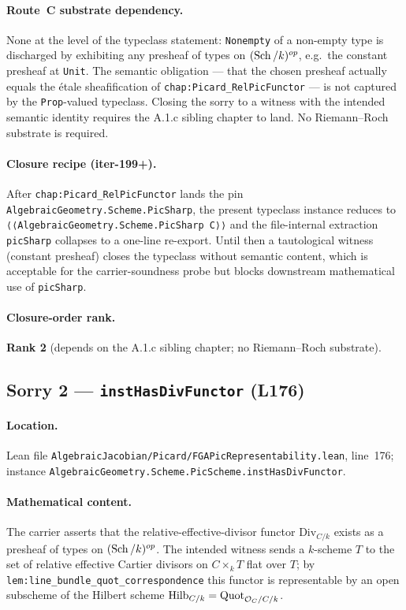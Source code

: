 \paragraph{Route~C substrate dependency.} None at the level of the
typeclass statement: \texttt{Nonempty} of a non-empty type is
discharged by exhibiting any presheaf of types on
$(\operatorname{Sch}/k)^{op}$, e.g.\ the constant presheaf at \texttt{Unit}. The
semantic obligation --- that the chosen presheaf actually equals the
\'etale sheafification of \texttt{chap:Picard_RelPicFunctor} --- is not
captured by the \texttt{Prop}-valued typeclass. Closing the sorry to a
witness with the intended semantic identity requires the A.1.c sibling
chapter to land. No Riemann--Roch substrate is required.

\paragraph{Closure recipe (iter-199+).} After
\texttt{chap:Picard_RelPicFunctor} lands the pin
\texttt{AlgebraicGeometry.Scheme.PicSharp}, the present typeclass
instance reduces to \texttt{⟨⟨AlgebraicGeometry.Scheme.PicSharp C⟩⟩}
and the file-internal extraction \texttt{picSharp} collapses to a
one-line re-export. Until then a tautological witness (constant
presheaf) closes the typeclass without semantic content, which is
acceptable for the carrier-soundness probe but blocks downstream
mathematical use of \texttt{picSharp}.

\paragraph{Closure-order rank.} \textbf{Rank 2} (depends on the A.1.c
sibling chapter; no Riemann--Roch substrate).

\subsection{Sorry 2 --- \texttt{instHasDivFunctor} (L176)}
\label{subsec:sorry_has_div_functor}

\paragraph{Location.} Lean file
\texttt{AlgebraicJacobian/Picard/FGAPicRepresentability.lean},
line~176; instance
\texttt{AlgebraicGeometry.Scheme.PicScheme.instHasDivFunctor}.

\paragraph{Mathematical content.} The carrier asserts that the
relative-effective-divisor functor $\mathrm{Div}_{C/k}$ exists as a
presheaf of types on $(\operatorname{Sch}/k)^{op}$. The intended witness sends a
$k$-scheme $T$ to the set of relative effective Cartier divisors on
$C \times_k T$ flat over $T$; by \texttt{lem:line_bundle_quot_correspondence}
this functor is representable by an open subscheme of the Hilbert
scheme $\operatorname{Hilb}_{C/k} = \operatorname{Quot}_{\mathcal{O}_C / C / k}$.

